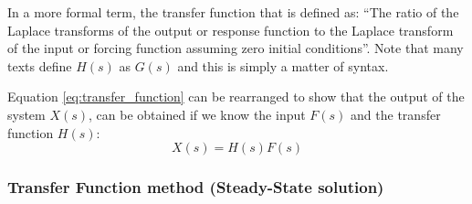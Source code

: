 \documentclass[12pt,letter]{article}
\numberwithin{ex}{section} %
\numberwithin{re}{section} %
\numberwithin{equation}{section}	%
\begin{document}
In a more formal term, the transfer function that is defined as: ``The ratio of the Laplace transforms of the output or response function to the Laplace transform of the input or forcing function assuming zero initial conditions''. Note that many texts define $H(s)$ as $G(s)$ and this is simply a matter of syntax. 

Equation \ref{eq:transfer_function} can be rearranged to show that the output of the system $X(s)$, can be obtained if we know the input $F(s)$ and the transfer function $H(s)$:
\begin{equation}
 X(s) = H(s)F(s)
\end{equation}	


\subsubsection{Transfer Function method (Steady-State solution)}
\end{document}
